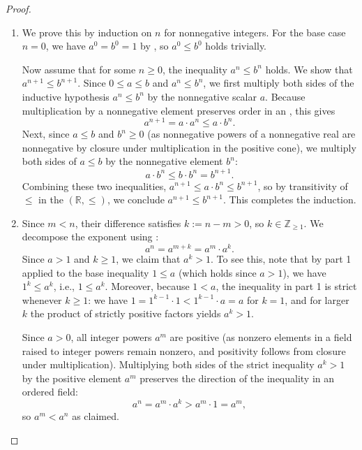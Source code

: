 \begin{proof}
\begin{enumerate}
    \item We prove this by induction on $n$ for nonnegative integers. For the base case $n = 0$, we have $a^0 = b^0 = 1$ by , so $a^0 \leq b^0$ holds trivially.

    Now assume that for some $n \geq 0$, the inequality $a^n \leq b^n$ holds. We show that $a^{n+1} \leq b^{n+1}$. Since $0 \leq a \leq b$ and $a^n \leq b^n$, we first multiply both sides of the inductive hypothesis $a^n \leq b^n$ by the nonnegative scalar $a$. Because multiplication by a nonnegative element preserves order in an , this gives
    $$a^{n+1} = a \cdot a^n \leq a \cdot b^n.$$
    Next, since $a \leq b$ and $b^n \geq 0$ (as nonnegative powers of a nonnegative real are nonnegative by closure under multiplication in the positive cone), we multiply both sides of $a \leq b$ by the nonnegative element $b^n$:
    $$a \cdot b^n \leq b \cdot b^n = b^{n+1}.$$
    Combining these two inequalities, $a^{n+1} \leq a \cdot b^n \leq b^{n+1}$, so by transitivity of $\leq$ in the  $(\mathbb{R}, \leq)$, we conclude $a^{n+1} \leq b^{n+1}$. This completes the induction.

    \item Since $m < n$, their difference satisfies $k := n - m > 0$, so $k \in \mathbb{Z}_{\geq 1}$. We decompose the exponent using :
    $$a^n = a^{m+k} = a^m \cdot a^k.$$
    Since $a > 1$ and $k \geq 1$, we claim that $a^k > 1$. To see this, note that by part 1 applied to the base inequality $1 \leq a$ (which holds since $a > 1$), we have $1^k \leq a^k$, i.e., $1 \leq a^k$. Moreover, because $1 < a$, the inequality in part 1 is strict whenever $k \geq 1$: we have $1 = 1^{k-1} \cdot 1 < 1^{k-1} \cdot a = a$ for $k=1$, and for larger $k$ the product of strictly positive factors yields $a^k > 1$.

    Since $a > 0$, all integer powers $a^m$ are positive (as nonzero elements in a field raised to integer powers remain nonzero, and positivity follows from closure under multiplication). Multiplying both sides of the strict inequality $a^k > 1$ by the positive element $a^m$ preserves the direction of the inequality in an ordered field:
    $$a^n = a^m \cdot a^k > a^m \cdot 1 = a^m,$$
    so $a^m < a^n$ as claimed.


\end{enumerate}
\end{proof}
